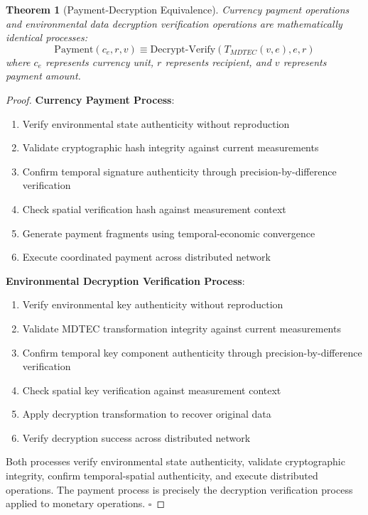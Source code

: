 \documentclass[12pt,a4paper]{article}
\newtheorem{theorem}{Theorem}
\begin{document}
\begin{theorem}[Payment-Decryption Equivalence]
Currency payment operations and environmental data decryption verification operations are mathematically identical processes:
\begin{equation}
\text{Payment}(c_e, r, v) \equiv \text{Decrypt-Verify}(T_{MDTEC}(v,e), e, r)
\end{equation}
where $c_e$ represents currency unit, $r$ represents recipient, and $v$ represents payment amount.
\end{theorem}

\begin{proof}
\textbf{Currency Payment Process}:
\begin{enumerate}
\item Verify environmental state authenticity without reproduction
\item Validate cryptographic hash integrity against current measurements
\item Confirm temporal signature authenticity through precision-by-difference verification
\item Check spatial verification hash against measurement context
\item Generate payment fragments using temporal-economic convergence
\item Execute coordinated payment across distributed network
\end{enumerate}

\textbf{Environmental Decryption Verification Process}:
\begin{enumerate}
\item Verify environmental key authenticity without reproduction
\item Validate MDTEC transformation integrity against current measurements
\item Confirm temporal key component authenticity through precision-by-difference verification
\item Check spatial key verification against measurement context
\item Apply decryption transformation to recover original data
\item Verify decryption success across distributed network
\end{enumerate}

Both processes verify environmental state authenticity, validate cryptographic integrity, confirm temporal-spatial authenticity, and execute distributed operations. The payment process is precisely the decryption verification process applied to monetary operations. $\square$
\end{proof}
\end{document}
